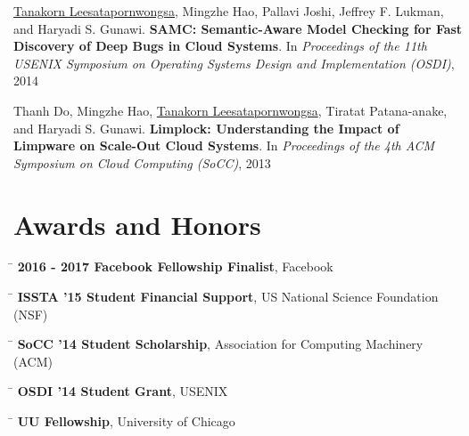 \documentclass[10pt]{article} %
\begin{document}
\underline{Tanakorn Leesatapornwongsa,} Mingzhe Hao, Pallavi Joshi, Jeffrey F.
Lukman, and Haryadi S. Gunawi. \textbf{SAMC: Semantic-Aware Model Checking for
Fast Discovery of Deep Bugs in Cloud Systems}. In \textit{Proceedings of the
11th USENIX Symposium on Operating Systems Design and Implementation (OSDI)},
2014
\vspace{2mm}

Thanh Do, Mingzhe Hao, \underline{Tanakorn Leesatapornwongsa}, Tiratat
Patana-anake, and Haryadi S. Gunawi. \textbf{Limplock: Understanding the Impact
of Limpware on Scale-Out Cloud Systems}. In \textit{Proceedings of the 4th ACM
Symposium on Cloud Computing (SoCC)}, 2013


\section{Awards and Honors}

\begin{tabbing}
\hspace{2.5cm} \=  \> \textbf{2016 - 2017 Facebook Fellowship Finalist}, Facebook
\end{tabbing}

\begin{tabbing}
\hspace{2.5cm} \=  \> \textbf{ISSTA '15 Student Financial Support}, US National Science Foundation (NSF)
\end{tabbing}

\begin{tabbing}
\hspace{2.5cm} \=  \> \textbf{SoCC '14 Student Scholarship}, Association for Computing Machinery (ACM)
\end{tabbing}

\begin{tabbing}
\hspace{2.5cm} \=  \> \textbf{OSDI '14 Student Grant}, USENIX
\end{tabbing}

\begin{tabbing}
\hspace{2.5cm} \=  \> \textbf{UU Fellowship}, University of Chicago
\end{tabbing}
\end{document}
